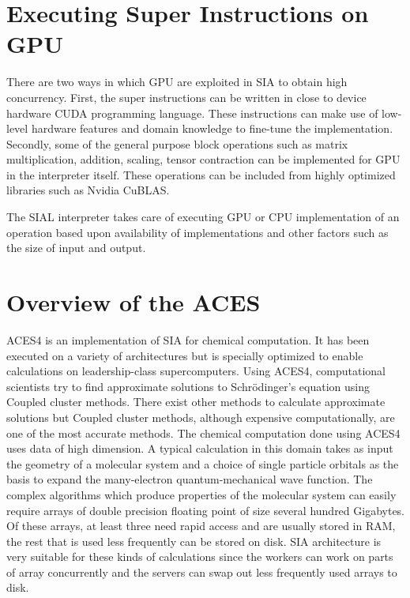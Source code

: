 \section{Executing Super Instructions on GPU}
There are two ways in which GPU are exploited in SIA to obtain high concurrency.
First, the super instructions can be written in close to device hardware CUDA
programming language. These instructions can make use of low-level hardware
features and domain knowledge to fine-tune the implementation. Secondly, some of
the general purpose block operations such as matrix multiplication, addition,
scaling, tensor contraction can be implemented for GPU in the interpreter
itself. These operations can be included from highly optimized libraries such as
Nvidia CuBLAS.

The SIAL interpreter takes care of executing GPU or CPU implementation of an
operation based upon availability of implementations and other factors such as
the size of input and output.

\section{Overview of the ACES}
ACES4 is an implementation of SIA for chemical computation. It has been executed
on a variety of architectures but is specially optimized to enable
calculations on leadership-class supercomputers. Using ACES4, computational scientists
try to find approximate solutions to Schrödinger’s equation using Coupled cluster
methods. There exist other methods to calculate approximate solutions but Coupled
cluster methods, although expensive computationally, are one of the most accurate methods.
The chemical computation done using ACES4 uses data of high dimension. A typical calculation in this domain
takes as input the geometry of a molecular system and a choice of single
particle orbitals as the basis to expand the many-electron quantum-mechanical wave
function. The complex algorithms which produce properties of the molecular
system can easily require arrays of double precision floating point of size
several hundred Gigabytes. Of these arrays, at least three need rapid access and
are usually stored in RAM, the rest that is used less frequently can be stored
on disk. SIA architecture is very suitable for these kinds of calculations since
the workers can work on parts of array concurrently and the servers can swap out
less frequently used arrays to disk.